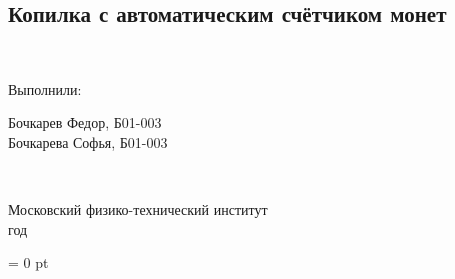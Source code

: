 \documentclass[a4paper,12pt]{extarticle}	%
\begin{document}
	\begin{titlepage}
	\begin{center}
	\vspace*{5cm}

	\section*{Копилка с автоматическим счётчиком монет}

	\begin{minipage}{0.3\textwidth}
	~
	\end{minipage}
	\hfill
	\begin{minipage}{0.2\textwidth}
		Выполнили:
	\end{minipage}
	\begin{minipage}{0.4\textwidth}
		Бочкарев Федор, Б01-003\\
		Бочкарева Софья, Б01-003
	\end{minipage}

	\begin{flushright}\textbf{\\}\end{flushright}

	\vfill

	Московский физико-технический институт\\
	\the\year{} год

	\end{center}
	\end{titlepage}

	\parindent=0cm
	\parskip=1pt
	\reversemarginpar
	\marginparpush = 0 pt

	
	
	
	
	
	
	
	
\end{document}

